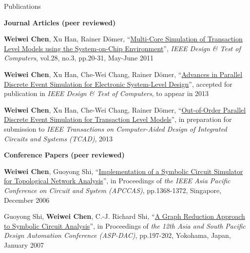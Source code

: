 \documentclass{resume} %
\newcommand{\mypubhl}[6]{
{#1}, {``\href{#2}{#3}''}, {#4}{\textit{#5}}, {#6}
\vspace{-0.5em}
}
\begin{document}
\begin{rSection}{Publications}

{\textbf{Journal Articles (peer reviewed)}}
\vspace{-2mm}
\begin{enumerate}
{\small
\item 
	\mypubhl
	{\textbf{Weiwei Chen}, Xu Han, Rainer D\"{o}mer}
	{http://www.cecs.uci.edu/~weiweic/publications/IEEEDT2011_WC_XH_RD.pdf}
	{Multi-Core Simulation of Transaction Level Models using the System-on-Chip Environment}
	{}
	{IEEE Design \& Test of Computers}
	{vol.28, no.3, pp.20-31, May-June 2011}
\item 
	\mypubhl
	{\textbf{Weiwei Chen}, Xu Han, Che-Wei Chang, Rainer D\"{o}mer}
	{http://www.cecs.uci.edu/~weiweic/publications/IEEEDT2013_WC_XH_CC_RD.pdf}
	{Advances in Parallel Discrete Event Simulation for Electronic System-Level Design} 
	{accepted for publication in }
	{IEEE Design \& Test of Computers}
	{to appear in  2013}
	
\item  
	\mypubhl
	{\textbf{Weiwei Chen}, Xu Han, Che-Wei Chang, Rainer D\"{o}mer}
	{http://www.cecs.uci.edu/~weiweic/publications/TCAD12_first_submssion_WC_XH_CC_RD.pdf}
	{Out-of-Order Parallel Discrete Event Simulation for Transaction Level Models} 
	{in preparation for submission to }
	{IEEE Transactions on Computer-Aided Design of Integrated Circuits and Systems (TCAD)} 
	{2013}
}	
\end{enumerate}

{\textbf{Conference Papers (peer reviewed)}}
\vspace{-2mm}
\begin{enumerate}
{\small
\item
	\mypubhl
	{\textbf{Weiwei Chen}, Guoyong Shi}
	{http://www.cecs.uci.edu/~weiweic/publications/APCCAS2006_WC_GS.pdf}
	{Implementation of a Symbolic Circuit Simulator for Topological Network Analysis}
	{in Proceedings of }
	{the IEEE Asia Pacific Conference on Circuit and System (APCCAS)}
	{pp.1368-1372, Singapore, December 2006}
	
\item
	\mypubhl
	{Guoyong Shi, \textbf{Weiwei Chen}, C.-J. Richard Shi}
	{http://www.cecs.uci.edu/~weiweic/publications/ASPDAC2007_GS_WC_RS.pdf}
	{A Graph Reduction Approach to Symbolic Circuit Analysis}
	{in Proceedings of }
	{the 12th Asia and South Pacific Design Automation Conference (ASP-DAC)} 
	{pp.197-202, Yokohama, Japan, January 2007}

}
\end{enumerate}
\end{rSection}
\end{document}
